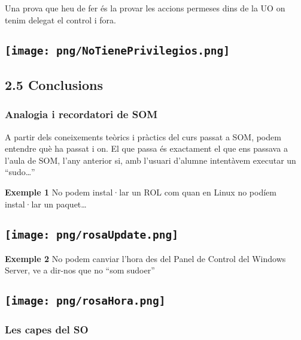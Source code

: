 \documentclass[
  a4paper,
]{article}
\begin{document}
Una prova que heu de fer és la provar les accions permeses dins de la UO
on tenim delegat el control i fora.

\subsection{\texorpdfstring{\protect\texttt{[image: png/NoTienePrivilegios.png]}}{Figura 11: Accions permeses però fora de la UO}}\label{figura-11-accions-permeses-peruxf2-fora-de-la-uo}

\subsection{2.5 Conclusions}\label{conclusions}

\subsubsection{Analogia i recordatori de
SOM}\label{analogia-i-recordatori-de-som}

A partir dels coneixements teòrics i pràctics del curs passat a SOM,
podem entendre què ha passat i on. El que passa és exactament el que ens
passava a l'aula de SOM, l'any anterior si, amb l'usuari d'alumne
intentàvem executar un ``sudo\ldots{}''

\textbf{Exemple 1} No podem instal·lar un ROL com quan en Linux no
podíem instal·lar un paquet\ldots{}

\subsection{\texorpdfstring{\protect\texttt{[image: png/rosaUpdate.png]}}{Figura 12: Eines per instal·lar apt}}\label{figura-12-eines-per-installar-apt}

\textbf{Exemple 2} No podem canviar l'hora des del Panel de Control del
Windows Server, ve a dir-nos que no ``som sudoer''

\subsection{\texorpdfstring{\protect\texttt{[image: png/rosaHora.png]}}{Figura 13: Canvi de data}}\label{figura-13-canvi-de-data}

\subsubsection{Les capes del SO}\label{les-capes-del-so}
\end{document}
